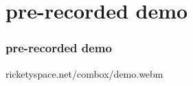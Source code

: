 
\section{pre-recorded demo}

\begin{frame}
  \frametitle{pre-recorded demo}
  \centering
  ricketyspace.net/combox/demo.webm
\end{frame}